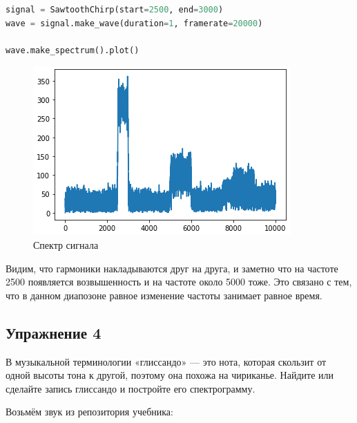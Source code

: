 \begin{lstlisting}[language=Python]
signal = SawtoothChirp(start=2500, end=3000)
wave = signal.make_wave(duration=1, framerate=20000)

wave.make_spectrum().plot()
\end{lstlisting}
\begin{figure}[H]
	\begin{center}
		\includegraphics[scale=1]{fig/lab03/lab3_7.png}
		\caption{Спектр сигнала}
	\end{center}
\end{figure}

Видим, что гармоники накладываются друг на друга, и заметно что на частоте 2500 появляется возвышенность и на частоте около 5000 тоже. Это связано с тем, что в данном диапозоне равное изменение частоты занимает равное время.

\subsection{Упражнение 4}

В музыкальной терминологии «глиссандо» — это нота, которая скользит от одной высоты тона к другой, поэтому она похожа на чириканье. Найдите или сделайте запись глиссандо и постройте его спектрограмму.

Возьмём звук из репозитория учебника:

